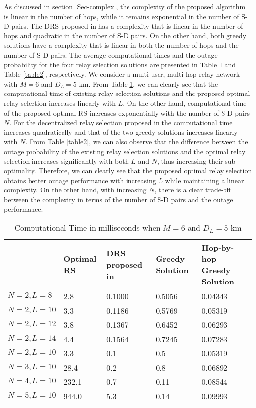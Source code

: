 \documentclass[12pt,draftclsnofoot,onecolumn]{IEEEtran}
\begin{document}
	As discussed in section \ref{Sec-complex}, the complexity of the proposed algorithm is linear in the number of hops, while it remains exponential in the number of S-D pairs. The DRS proposed in \cite{2809748} has a complexity that is linear in the number of hops and quadratic in the number of S-D pairs. On the other hand, both greedy solutions have a complexity that is linear in both the number of hops and the number of S-D pairs. The average computational times and the outage probability for the four relay selection solutions are presented in Table \ref{table1} and Table \ref{table2}, respectively. We consider a multi-user, multi-hop relay network with $M=6$ and $D_L = 5$ km. From Table \ref{table1}, we can clearly see that the computational time of existing relay selection solutions and the proposed optimal relay selection increases linearly with $L$. On the other hand, computational time of the proposed optimal RS increases exponentially with the number of S-D pairs $N$.  For the decentralized relay selection proposed in \cite{2809748} the computational time increases quadratically and that of the two greedy solutions increases linearly with $N$. From Table \ref{table2}, we can also observe that the difference between the outage probability of the existing relay selection solutions and the optimal relay selection increases significantly with both $L$ and $N$, thus increasing their sub-optimality. Therefore, we can clearly see that the proposed optimal relay selection obtains better outage performance with increasing $L$ while maintaining a linear complexity. On the other hand, with increasing $N$, there is a clear trade-off between the complexity in terms of the number of S-D pairs and the outage performance.
	\begin{table}%
		\centering
		\caption{Computational Time in milliseconds when $M=6$ and $D_L=5$ km}
		\begin{tabular}
			{ |p{3cm}|p{2.75cm}|p{2.75cm}|p{2.75cm}|p{2.75cm}| }
			\hline
			& Optimal RS & DRS proposed in \cite{2809748} & Greedy Solution & Hop-by-hop Greedy Solution \\ \hline  
			$N=2, L=8$ & 2.8 & 0.1000 & 0.5056 & 0.04343 \\ \hline		
			$N=2, L=10$ & 3.3 & 0.1186 & 0.5769 & 0.05319 \\ \hline
			$N=2, L=12$ & 3.8 & 0.1367 & 0.6452 & 0.06293 \\ \hline
			$N=2, L=14$ & 4.4 & 0.1564 & 0.7245 & 0.07283  \\ \hline
			$N=2, L=10$ & 3.3 & 0.1 & 0.5 & 0.05319 \\ \hline		
			$N=3, L=10$ & 28.4 & 0.2 & 0.8 & 0.06892 \\ \hline	
			$N=4, L=10$ & 232.1 & 0.7 & 0.11 & 0.08544 \\ \hline	
			$N=5, L=10$ & 944.0 & 5.3 & 0.14 & 0.09993 \\ \hline
		\end{tabular}
		\label{table1}
	\end{table}	
\end{document}
